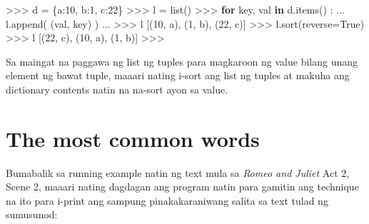 \documentclass[10pt,]{book}
\newenvironment{Shaded}{}{}
\newcommand{\BuiltInTok}[1]{\textcolor[rgb]{0.00,0.50,0.00}{#1}}
\newcommand{\ControlFlowTok}[1]{\textcolor[rgb]{0.00,0.44,0.13}{\textbf{#1}}}
\newcommand{\DecValTok}[1]{\textcolor[rgb]{0.25,0.63,0.44}{#1}}
\newcommand{\KeywordTok}[1]{\textcolor[rgb]{0.00,0.44,0.13}{\textbf{#1}}}
\newcommand{\NormalTok}[1]{#1}
\newcommand{\OperatorTok}[1]{\textcolor[rgb]{0.40,0.40,0.40}{#1}}
\newcommand{\StringTok}[1]{\textcolor[rgb]{0.25,0.44,0.63}{#1}}
\newcommand{\VariableTok}[1]{\textcolor[rgb]{0.10,0.09,0.49}{#1}}
\begin{document}
\begin{Shaded}
\begin{Highlighting}[]
\OperatorTok{\textgreater{}\textgreater{}\textgreater{}}\NormalTok{ d }\OperatorTok{=}\NormalTok{ \{}\StringTok{\textquotesingle{}a\textquotesingle{}}\NormalTok{:}\DecValTok{10}\NormalTok{, }\StringTok{\textquotesingle{}b\textquotesingle{}}\NormalTok{:}\DecValTok{1}\NormalTok{, }\StringTok{\textquotesingle{}c\textquotesingle{}}\NormalTok{:}\DecValTok{22}\NormalTok{\}}
\OperatorTok{\textgreater{}\textgreater{}\textgreater{}}\NormalTok{ l }\OperatorTok{=} \BuiltInTok{list}\NormalTok{()}
\OperatorTok{\textgreater{}\textgreater{}\textgreater{}} \ControlFlowTok{for}\NormalTok{ key, val }\KeywordTok{in}\NormalTok{ d.items() :}
\NormalTok{...     l.append( (val, key) )}
\NormalTok{...}
\OperatorTok{\textgreater{}\textgreater{}\textgreater{}}\NormalTok{ l}
\NormalTok{[(}\DecValTok{10}\NormalTok{, }\StringTok{\textquotesingle{}a\textquotesingle{}}\NormalTok{), (}\DecValTok{1}\NormalTok{, }\StringTok{\textquotesingle{}b\textquotesingle{}}\NormalTok{), (}\DecValTok{22}\NormalTok{, }\StringTok{\textquotesingle{}c\textquotesingle{}}\NormalTok{)]}
\OperatorTok{\textgreater{}\textgreater{}\textgreater{}}\NormalTok{ l.sort(reverse}\OperatorTok{=}\VariableTok{True}\NormalTok{)}
\OperatorTok{\textgreater{}\textgreater{}\textgreater{}}\NormalTok{ l}
\NormalTok{[(}\DecValTok{22}\NormalTok{, }\StringTok{\textquotesingle{}c\textquotesingle{}}\NormalTok{), (}\DecValTok{10}\NormalTok{, }\StringTok{\textquotesingle{}a\textquotesingle{}}\NormalTok{), (}\DecValTok{1}\NormalTok{, }\StringTok{\textquotesingle{}b\textquotesingle{}}\NormalTok{)]}
\OperatorTok{\textgreater{}\textgreater{}\textgreater{}}
\end{Highlighting}
\end{Shaded}

Sa maingat na paggawa ng list ng tuples para magkaroon ng value bilang
unang element ng bawat tuple, maaari nating i-sort ang list ng tuples at
makuha ang dictionary contents natin na na-sort ayon sa value.

\section{The most common words}\label{the-most-common-words}


Bumabalik sa running example natin ng text mula sa \emph{Romeo and
Juliet} Act 2, Scene 2, maaari nating dagdagan ang program natin para
gamitin ang technique na ito para i-print ang sampung pinakakaraniwang
salita sa text tulad ng sumusunod:
\end{document}
